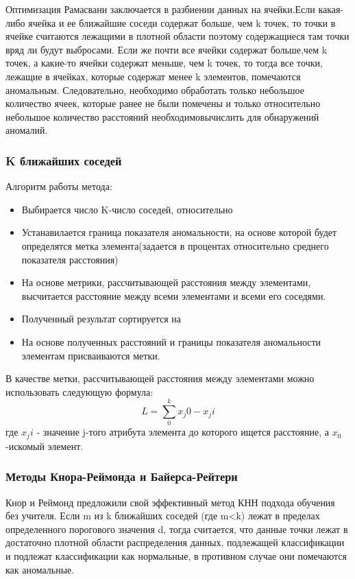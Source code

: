  Оптимизация Рамасвани заключается в разбиении данных на ячейки.Если какая-либо ячейка и ее ближайшие соседи содержат больше, чем k
 точек, то точки в ячейке считаются лежащими в плотной области
 поэтому содержащиеся там точки вряд ли будут выбросами. Если же почти все ячейки содержат больше,чем k точек, а какие-то ячейки содержат меньше, чем k точек, то тогда все точки, лежащие в ячейках, которые содержат  менее k элементов, помечаются  аномальным. Следовательно,
 необходимо обработать только небольшое количество ячеек, которые ранее не были помечены и только относительно небольшое количество расстояний необходимовычислить для обнаружений аномалий. 
 \subsubsection{K ближайших соседей}
 Алгоритм работы метода:
 \begin{itemize}
 	\item Выбирается число K-число соседей, относительно
 	\item Устанавилается граница показателя аномальности, на основе которой будет определятся метка элемента(задается в процентах относительно среднего показателя расстояния)
 	\item На основе метрики, рассчитывающей расстояния между элементами, высчитается расстояние между всеми элементами и всеми его соседями.
 	\item Полученный результат сортируется на 
 	\item На основе полученных расстояний и границы показателя аномальности элементам присваиваются метки.
 \end{itemize}
 В качестве метки, рассчитывающей расстояния между элементами можно использовать следующую формула:
 \begin{equation}
 L=\sum_{0}^{k}x_j0 - x_ji
 \end{equation}
 где $x_ji$ - значение j-того атрибута элемента до которого ищется расстояние, а $x_0$-искомый элемент.
 
 \subsubsection{Методы Кнора-Реймонда и Байерса-Рейтери}
 Кнор и Реймонд предложили свой эффективный метод  КНН подхода обучения без учителя\cite{Book09}. Если m из k ближайших соседей (где m<k) лежат
 в пределах определенного порогового значения d, тогда  считается, что  данные точки лежат в достаточно плотной области распределения данных, подлежащей классификации и подлежат классификации как нормальные, в противном случае они помечаются как аномальные.
 

